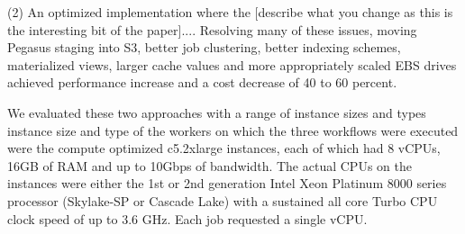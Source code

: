 \documentclass[a4paper, 10pt, conference]{ieeeconf}
\begin{document}
(2) An optimized implementation where the [describe what you change as this is the interesting bit of the paper].... Resolving many of these issues, moving Pegasus staging into S3, better job clustering, better indexing schemes, materialized views, larger cache values and more appropriately scaled EBS drives achieved performance increase and a cost decrease of 40 to 60 percent.

We evaluated these two approaches with a range of instance sizes and types
instance size and type of the workers on which the three workflows were executed were the compute optimized c5.2xlarge instances, each of which had 8 vCPUs, 16GB of RAM and up to 10Gbps of bandwidth. The actual CPUs on the instances were either the 1st or 2nd generation Intel Xeon Platinum 8000 series processor (Skylake-SP or Cascade Lake) with a sustained all core Turbo CPU clock speed of up to 3.6 GHz. Each job requested a single vCPU. 
 

\end{document}
